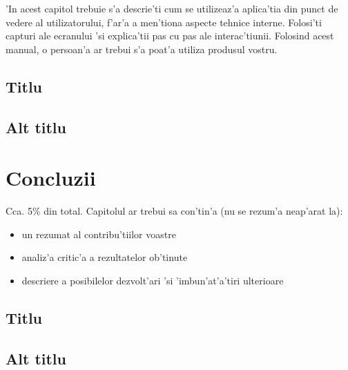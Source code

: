 \documentclass[12pt,a4paper,twoside]{report}
\begin{document}
'In acest capitol trebuie s'a descrie'ti cum se utilizeaz'a aplica'tia din punct de vedere al utilizatorului, f'ar'a a men'tiona aspecte tehnice interne.
Folosi'ti capturi ale ecranului 'si explica'tii pas cu pas ale interac'tiunii. 
Folosind acest manual, o persoan'a ar trebui s'a poat'a utiliza produsul vostru.

\section{Titlu}
\section{Alt titlu}

\chapter{Concluzii}

Cca. 5\% din total.
Capitolul ar trebui sa con'tin'a (nu se rezum'a neap'arat la):
\begin{itemize}
 \item un rezumat al contribu'tiilor voastre
\item analiz'a critic'a a rezultatelor ob'tinute
\item descriere a posibilelor dezvolt'ari 'si 'imbun'at'a'tiri ulterioare
\end{itemize}


\section{Titlu}
\section{Alt titlu}


\nocite{*}
 


\end{document}
